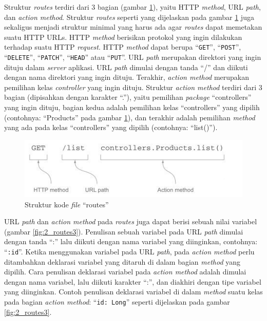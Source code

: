 Struktur \textit{routes} terdiri dari 3 bagian (gambar \ref{fig:2_routes2}), yaitu HTTP \textit{method}, URL \textit{path}, dan \textit{action method}. Struktur \textit{routes} seperti yang dijelaskan pada gambar \ref{fig:2_routes2} juga sekaligus menjadi struktur minimal yang harus ada agar \textit{routes} dapat memetakan suatu HTTP URLs. HTTP \textit{method} berisikan protokol yang ingin dilakukan terhadap suatu HTTP \textit{request}. HTTP \textit{method} dapat berupa ``\texttt{GET}'', ``\texttt{POST}'', ``\texttt{DELETE}'', ``\texttt{PATCH}'', ``\texttt{HEAD}'' atau ``\texttt{PUT}''\cite{playframeworkrouting1}. URL \textit{path} merupakan direktori yang ingin dituju dalam \textit{server} aplikasi. URL \textit{path} dimulai dengan tanda ``/'' dan diikuti dengan nama direktori yang ingin dituju. Terakhir, \textit{action method} merupakan pemilihan kelas \textit{controller} yang ingin dituju. Struktur \textit{action method} terdiri dari 3 bagian (dipisahkan dengan karakter ``.''), yaitu pemilihan \textit{package} ``controllers'' yang ingin dituju, bagian kedua adalah pemilihan kelas ``controllers'' yang dipilih (contohnya: ``Products'' pada gambar \ref{fig:2_routes2}), dan terakhir adalah pemilihan \textit{method} yang ada pada kelas ``controllers'' yang dipilih (contohnya: ``list()'').

\begin{figure}[htbp]
	\centering
		\includegraphics[scale=0.8]{Gambar/2_routes2.JPG}
	\caption{Struktur kode \textit{file} ``routes''\cite{playforjava}}
	\label{fig:2_routes2}
\end{figure}

URL \textit{path} dan \textit{action method} pada \textit{routes} juga dapat berisi sebuah nilai variabel (gambar \ref{fig:2_routes3}). Penulisan sebuah variabel pada URL \textit{path} dimulai dengan tanda ``:'' lalu diikuti dengan nama variabel yang diinginkan, contohnya: ``\texttt{:id}''. Ketika menggunakan variabel pada URL \textit{path}, pada \textit{action method} perlu ditambahkan deklarasi variabel yang ditaruh di dalam bagian \textit{method} yang dipilih. Cara penulisan deklarasi variabel pada \textit{action method} adalah dimulai dengan nama variabel, lalu diikuti karakter ``:'', dan diakhiri dengan tipe variabel yang diinginkan. Contoh penulisan deklarasi variabel di dalam \textit{method} suatu kelas pada bagian \textit{action method}: ``\texttt{id: Long}'' seperti dijelaskan pada gambar \ref{fig:2_routes3}. 

